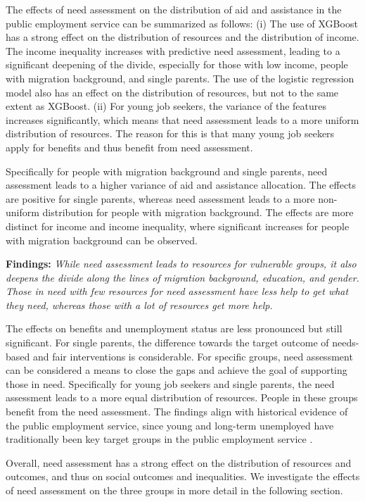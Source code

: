 \documentclass{article} %
\begin{document}
The effects of need assessment on the distribution of aid and assistance in the public employment service can be summarized as follows: (i) The use of XGBoost has a strong effect on the distribution of resources and the distribution of income. The income inequality increases with predictive need assessment, leading to a significant deepening of the divide, especially for those with low income, people with migration background, and single parents. The use of the logistic regression model also has an effect on the distribution of resources, but not to the same extent as XGBoost. (ii) For young job seekers, the variance of the features increases significantly, which means that need assessment leads to a more uniform distribution of resources. The reason for this is that many young job seekers apply for benefits and thus benefit from need assessment.

Specifically for people with migration background and single parents, need assessment leads to a higher variance of aid and assistance allocation. The effects are positive for single parents, whereas need assessment leads to a more non-uniform distribution for people with migration background. The effects are more distinct for income and income inequality, where significant increases for people with migration background can be observed.

\textbf{Findings:} \emph{While need assessment leads to resources for vulnerable groups, it also deepens the divide along the lines of migration background, education, and gender. Those in need with few resources for need assessment have less help to get what they need, whereas those with a lot of resources get more help.}

The effects on benefits and unemployment status are less pronounced but still significant. For single parents, the difference towards the target outcome of needs-based and fair interventions is considerable. For specific groups, need assessment can be considered a means to close the gaps and achieve the goal of supporting those in need. Specifically for young job seekers and single parents, the need assessment leads to a more equal distribution of resources. People in these groups benefit from the need assessment. The findings align with historical evidence of the public employment service, since young and long-term unemployed have traditionally been key target groups in the public employment service \cite{Kallus03042021, wirtz2019artificial}.

Overall, need assessment has a strong effect on the distribution of resources and outcomes, and thus on social outcomes and inequalities. We investigate the effects of need assessment on the three groups in more detail in the following section.
\end{document}
